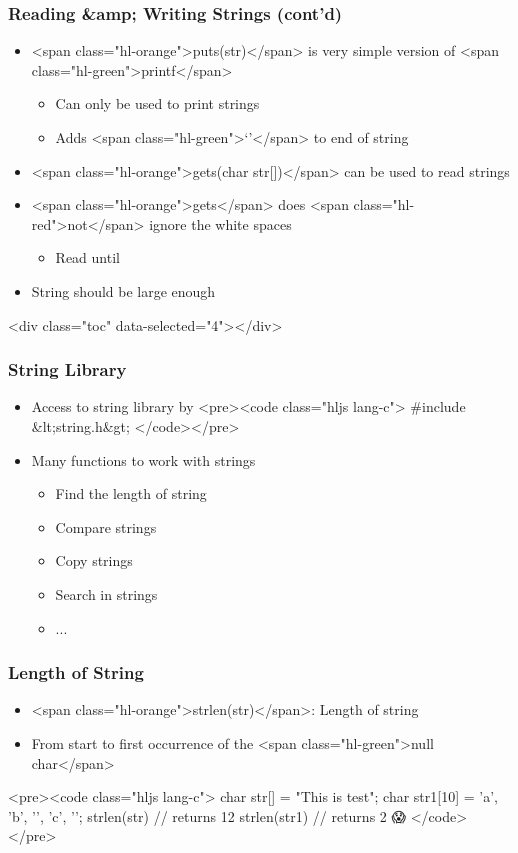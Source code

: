 \documentclass{../c-lecture}
\begin{document}
\begin{frame}
  \frametitle{Reading &amp; Writing Strings (cont’d)}
  \begin{itemize}
    \item
      <span class="hl-orange">puts(str)</span> is very simple version of
      <span class="hl-green">printf</span>

    \begin{itemize}
      \item Can only be used to print strings
      \item Adds <span class="hl-green">‘\n’</span> to end of string
    \end{itemize}
    \item
      <span class="hl-orange">gets(char str[])</span> can be used to read
      strings

    \item
      <span class="hl-orange">gets</span> does
      <span class="hl-red">not</span> ignore the white spaces

    \begin{itemize}
      \item Read until \n
    \end{itemize}
    \item String should be large enough
  \end{itemize}
\end{frame}
\begin{frame}
  <div class="toc" data-selected="4"></div>
\end{frame}
\begin{frame}
  \frametitle{String Library}
  \begin{itemize}
    \item Access to string library by
    <pre><code class="hljs lang-c">
#include &lt;string.h&gt;
    </code></pre>
    \item Many functions to work with strings
    \begin{itemize}
      \item Find the length of string
      \item Compare strings
      \item Copy strings
      \item Search in strings
      \item ...
    \end{itemize}
  \end{itemize}
\end{frame}
\begin{frame}
  \frametitle{Length of String}
  \begin{itemize}
    \item <span class="hl-orange">strlen(str)</span>: Length of string
    \item
      From start to first occurrence of the
      <span class="hl-green">null char</span>

  \end{itemize}
  <pre><code class="hljs lang-c">
char str[] = "This is test";
char str1[10] = {'a', 'b', '\0', 'c', '\0'};
strlen(str)  // returns 12
strlen(str1) // returns 2 😱
  </code></pre>
\end{frame}
\end{document}
